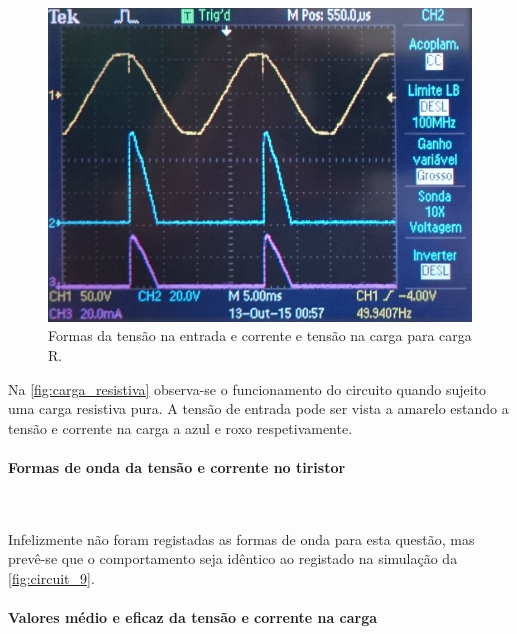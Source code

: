 \documentclass[a4paper,11pt]{article}
\numberwithin{equation}{section}
\begin{document}
\begin{figure}[H]
	\centering
	\includegraphics[keepaspectratio=true, scale=0.12]{img/figs/carga_resistiva}
	\caption{Formas da tensão na entrada e corrente e tensão na carga para carga R.}
	\label{fig:carga_resistiva}
	\vspace{-0.8em}
\end{figure}


Na \autoref{fig:carga_resistiva} observa-se o funcionamento do circuito quando sujeito uma carga resistiva pura. A tensão de entrada pode ser vista a amarelo estando a tensão e corrente na carga a azul e roxo respetivamente.




\pagebreak

\paragraph{Formas de onda da tensão e corrente no tiristor}\mbox{}\

Infelizmente não foram registadas as formas de onda para esta questão, mas prevê-se que o comportamento seja idêntico ao registado na simulação da \autoref{fig:circuit_9}.

\paragraph{Valores médio e eficaz da tensão e corrente na carga}\mbox{}\
\end{document}
